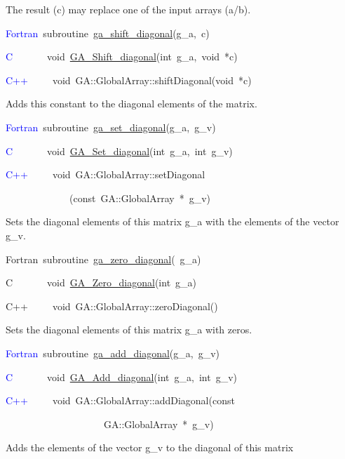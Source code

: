 The result (c) may replace one of the input arrays (a/b). 
\begin{lyxcode}
\textcolor{blue}{Fortran}~subroutine~\href{http://www.emsl.pnl.gov/docs/global/ga_ops.html\#ga_shift_diagonal}{ga\_{}shift\_{}diagonal}(g\_a,~c)~

\textcolor{blue}{C}~~~~~~~void~\href{http://www.emsl.pnl.gov/docs/global/c_nga_ops.html\#ga_shift_diagonal}{GA\_{}Shift\_{}diagonal}(int~g\_a,~void~{*}c)~

\textcolor{blue}{C++}~~~~~void~GA::GlobalArray::shiftDiagonal(void~{*}c)
\end{lyxcode}
Adds this constant to the diagonal elements of the matrix.
\begin{lyxcode}
\textcolor{blue}{Fortran}~subroutine~\href{http://www.emsl.pnl.gov/docs/global/ga_ops.html\#ga_set_diagonal}{ga\_{}set\_{}diagonal}(g\_a,~g\_v)~

\textcolor{blue}{C}~~~~~~~void~\href{http://www.emsl.pnl.gov/docs/global/c_nga_ops.html\#ga_set_diagonal}{GA\_{}Set\_{}diagonal}(int~g\_a,~int~g\_v)

\textcolor{blue}{C++}~~~~~void~GA::GlobalArray::setDiagonal~

~~~~~~~~~~~~~(const~GA::GlobalArray~{*}~g\_v)
\end{lyxcode}
Sets the diagonal elements of this matrix g\_a with the elements of
the vector g\_v.
\begin{lyxcode}
Fortran~subroutine~\href{http://www.emsl.pnl.gov/docs/global/ga_ops.html\#ga_zero_diagonal}{ga\_{}zero\_{}diagonal}(~g\_a)~

C~~~~~~~void~\href{http://www.emsl.pnl.gov/docs/global/c_nga_ops.html\#ga_zero_diagonal}{GA\_{}Zero\_{}diagonal}(int~g\_a)~

C++~~~~~void~GA::GlobalArray::zeroDiagonal()
\end{lyxcode}
Sets the diagonal elements of this matrix g\_a with zeros. 
\begin{lyxcode}
\textcolor{blue}{Fortran}~subroutine~\href{http://www.emsl.pnl.gov/docs/global/ga_ops.html\#ga_add_diagonal}{ga\_{}add\_{}diagonal}(g\_a,~g\_v)~

\textcolor{blue}{C}~~~~~~~void~\href{http://www.emsl.pnl.gov/docs/global/c_nga_ops.html\#ga_add_diagonal}{GA\_{}Add\_{}diagonal}(int~g\_a,~int~g\_v)

\textcolor{blue}{C++}~~~~~void~GA::GlobalArray::addDiagonal(const~

~~~~~~~~~~~~~~~~~~~~GA::GlobalArray~{*}~g\_v)
\end{lyxcode}
Adds the elements of the vector g\_v to the diagonal of this matrix
